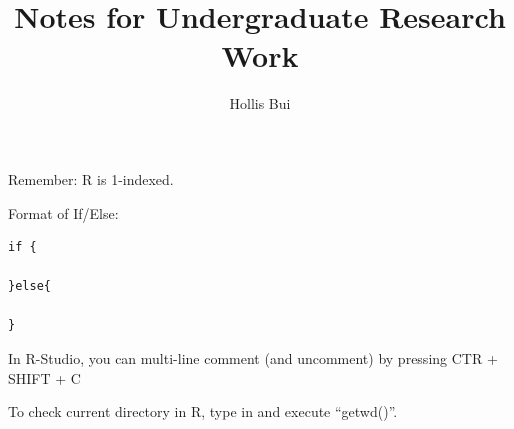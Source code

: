 \documentclass[12pt,hyperref]{labbook}
\title{Notes for Undergraduate Research Work}
\author{Hollis Bui}
\begin{document}
\maketitle
\newpage
\tableofcontents
\newpage



Remember: R is 1-indexed.

Format of If/Else:

\noindent\begin{minipage}{\linewidth}
\begin{lstlisting}
if {

}else{

}
\end{lstlisting}
\end{minipage}

In R-Studio, you can multi-line comment (and uncomment) by pressing
CTR + SHIFT + C

To check current directory in R, type in and execute \enquote{getwd()}.

\end{document}
